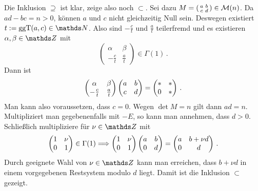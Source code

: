 \begin{bewe}
Die Inklusion $\supseteq$ ist klar, zeige also noch $\subset$. Sei dazu $M = \abcd \in \mathcal M (n)$. Da $ad-bc = n > 0$, können $a$ und $c$ nicht gleichzeitig Null sein. Deswegen existiert $t := \ggt (a,c) \in \NN$. Also sind $-\frac ct$ und $\frac at$ teilerfremd und es existieren $\alpha, \beta \in \ZZ$ mit
\[
\begin{pmatrix}
\alpha & \beta\\
-\frac ct & \frac at
\end{pmatrix}
\in \Gamma (1)
\,.
\]
Dann ist
\[
\begin{pmatrix}
\alpha & \beta\\
-\frac ct & \frac at
\end{pmatrix} \abcd
= \begin{pmatrix}
* & *\\ 0 & *
\end{pmatrix}
\,.
\]
Man kann also voraussetzen, dass $c = 0$. Wegen $\det M = n$ gilt dann $ad = n$. Multipliziert man gegebenenfalls mit $- E$, so kann man annehmen, dass $d > 0$. Schließlich multipliziere für $\nu \in \ZZ$ mit 
\[
\begin{pmatrix}
1 & \nu\\
0 & 1
\end{pmatrix} 
\in \Gamma (1) \Longrightarrow 
\begin{pmatrix}
1 & \nu\\
0 & 1
\end{pmatrix}
\begin{pmatrix}
a & b\\
0 & d
\end{pmatrix}
= 
\begin{pmatrix}
a & b + \nu d\\
0 & d
\end{pmatrix}
\,.
\]
Durch geeignete Wahl von $\nu \in \ZZ$ kann man erreichen, dass $b + \nu d$ in einem vorgegebenen Restsystem modulo $d$ liegt. Damit ist die Inklusion $\subset$ gezeigt.


\end{bewe}
